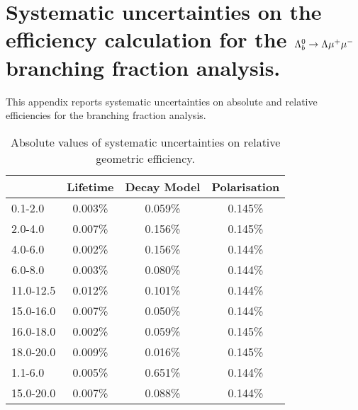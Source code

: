 \chapter{Systematic uncertainties on the efficiency calculation for the $\Lambda^0_b\rightarrow\Lambda\mu^+\mu^-$
branching fraction analysis.}
\label{app:Lb_systematics}

This appendix reports systematic uncertainties on absolute and relative 
efficiencies for the \Lb\to\Lz\mumu branching fraction analysis.


\begin{table}
\centering
\begin{tabular}{l|ccc} 
\qsq [\gevgevcccc]	 & Lifetime  & Decay Model   & Polarisation  \\ \hline
0.1-2.0  	 & 0.003\% 	 & 0.059\% 	 & 0.145\% 	 \\ 
2.0-4.0  	 & 0.007\% 	 & 0.156\% 	 & 0.145\% 	 \\ 
4.0-6.0  	 & 0.002\% 	 & 0.156\% 	 & 0.144\% 	 \\ 
6.0-8.0      & 0.003\%   & 0.080\%   & 0.144\%   \\
11.0-12.5  	 & 0.012\% 	 & 0.101\% 	 & 0.144\% 	 \\ 
15.0-16.0  	 & 0.007\% 	 & 0.050\% 	 & 0.144\% 	 \\ 
16.0-18.0  	 & 0.002\% 	 & 0.059\% 	 & 0.145\% 	 \\ 
18.0-20.0  	 & 0.009\% 	 & 0.016\% 	 & 0.145\% 	 \\ 
 \hline
1.1-6.0  	 & 0.005\% 	 & 0.651\% 	 & 0.144\% 	 \\ 
15.0-20.0  	 & 0.007\% 	 & 0.088\% 	 & 0.144\% 	 \\ 
\end{tabular}
\caption{Absolute values of systematic uncertainties on relative geometric efficiency.}
\label{tab:relativeGeomSys}
\end{table}

